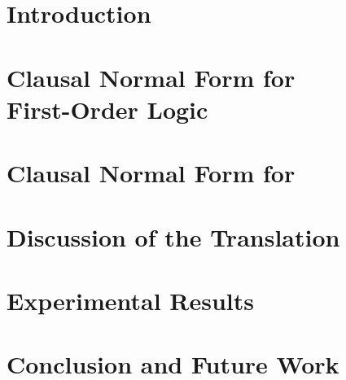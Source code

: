 \section{Introduction}
\label{sec:newcnf/introduction}


\section[Clausal Normal Form for First-Order Logic]{Clausal Normal Form for\\First-Order Logic}
\label{sec:newcnf/cnf}


\section{Clausal Normal Form for \folb}
\label{sec:newcnf/fool}


\section{Discussion of the Translation}
\label{sec:newcnf/comparison}


\section{Experimental Results}
\label{sec:newcnf/experiments}


%

\section{Conclusion and Future Work}
\label{sec:newcnf/conclusions}
